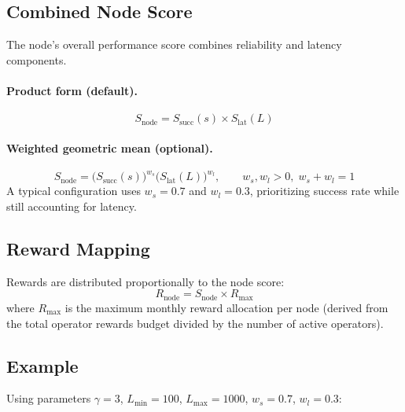 \documentclass[10pt,twocolumn]{article}
\begin{document}
\subsection{Combined Node Score}
The node's overall performance score combines reliability and latency components.

\paragraph{Product form (default).}
\[
S_{\text{node}} = S_{\text{succ}}(s) \times S_{\text{lat}}(L)
\]

\paragraph{Weighted geometric mean (optional).}
\[
S_{\text{node}} =
\big(S_{\text{succ}}(s)\big)^{w_s}
\big(S_{\text{lat}}(L)\big)^{w_l},
\qquad w_s, w_l > 0,\; w_s + w_l = 1
\]
A typical configuration uses $w_s = 0.7$ and $w_l = 0.3$, prioritizing success rate while still accounting for latency.

\subsection{Reward Mapping}
Rewards are distributed proportionally to the node score:
\[
R_{\text{node}} = S_{\text{node}} \times R_{\max}
\]
where $R_{\max}$ is the maximum monthly reward allocation per node (derived from the total operator rewards budget divided by the number of active operators).

\subsection{Example}
Using parameters $\gamma = 3$, $L_{\min} = 100$, $L_{\max} = 1000$, $w_s = 0.7$, $w_l = 0.3$:
\end{document}

